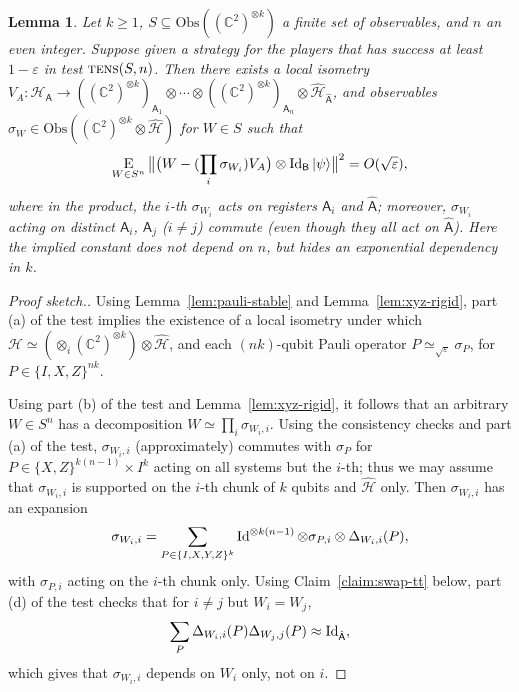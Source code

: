 \documentclass[11pt]{article}
\newtheorem{lemma}[theorem]{Lemma}
\theoremstyle{remark}
\theoremstyle{definition}
\newcommand{\ket}[1]{|#1\rangle}
\newcommand{\Id}{\ensuremath{\mathop{\rm Id}\nolimits}}
\newcommand{\Es}[1]{\ensuremath{\mathop{\textsc{E}}_{#1}}}
\newcommand{\reg}[1]{{\textsf{#1}}}
\newcommand{\C}{\ensuremath{\mathbb{C}}}
\newcommand{\mH}{\mathcal{H}}
\newcommand{\setft}[1]{\mathrm{#1}}
\newcommand{\Obs}{\setft{Obs}}
\newcommand{\eps}{\varepsilon}
\newcommand{\perm}{\textsc{tens}}
\begin{document}
\begin{lemma}\label{lem:perm-test}
Let $k\geq 1$, $S\subseteq \Obs((\C^2)^{\otimes k})$ a finite set of observables, and $n$ an even integer. Suppose given a strategy for the players that has success at least $1-\eps$ in test $\perm(S,n)$. Then there exists a local isometry $V_A:\mH_{\reg{A}}\to ((\C^2)^{\otimes k})_{\reg{A}_1}\otimes \cdots\otimes ((\C^2)^{\otimes k})_{\reg{A}_n}\otimes \hat{\mH}_{\hat{\reg{A}}}$, and observables $\sigma_{W} \in \Obs((\C^2)^{\otimes k}\otimes\hat{\mH})$ for $W\in S$ such that 
$$ \Es{W\in S^n} \big\|\big(W - (\prod_i \sigma_{W_i} ) V_A\big)\otimes \Id_{\reg{B}}\ket{\psi} \big\|^2 = O(\sqrt{\eps}),$$
where in the product, the $i$-th $\sigma_{W_i}$ acts on registers $\reg{A}_i$ and $\hat{\reg{A}}$; moreover, $\sigma_{W_i}$ acting on distinct $\reg{A}_i$, $\reg{A}_j$ ($i\neq j$) commute (even though they all act on $\hat{\reg{A}}$). 
Here the implied constant does not depend on $n$, but hides an exponential dependency in $k$.
\end{lemma}


\begin{proof}[Proof sketch.]
Using Lemma~\ref{lem:pauli-stable} and Lemma~\ref{lem:xyz-rigid}, part (a) of the test implies the existence of a local isometry under which $\mH \simeq (\otimes_i (\C^2)^{\otimes k}) \otimes \hat{\mH}$, and each $(nk)$-qubit Pauli operator $P\simeq_{\sqrt{\eps}} \sigma_P$, for $P\in\{I,X,Z\}^{nk}$. 

Using part (b) of the test and Lemma~\ref{lem:xyz-rigid}, it follows that an arbitrary $W\in S^n$ has a decomposition $W\simeq \prod_i \sigma_{W_i,i}$. Using the consistency checks and part (a) of the test, $\sigma_{W_i,i}$ (approximately) commutes with $\sigma_P$ for $P\in\{X,Z\}^{k(n-1)} \times I^k$ acting on all systems but the $i$-th; thus we may assume that $\sigma_{W_i,i}$ is supported on the $i$-th chunk of $k$ qubits and $\hat{\mH}$ only. Then $\sigma_{W_i,i}$ has an expansion 
$$ \sigma_{W_i,i} = \sum_{P\in\{I,X,Y,Z\}^k} \Id^{\otimes k(n-1)}\otimes  \sigma_{P,i} \otimes \Delta_{W_i,i}(P),$$
with $\sigma_{P,i}$ acting on the $i$-th chunk only. Using Claim~\ref{claim:swap-tt} below, part (d) of the test checks that for $i\neq j$ but $W_i=W_j$, 
$$\sum_P  \Delta_{W_i,i}(P) \Delta_{W_j,j}(P) \approx \Id_{\hat{\reg{A}}},$$
which gives that $\sigma_{W_i,i}$ depends on $W_i$ only, not on $i$. 
\end{proof}
\end{document}
